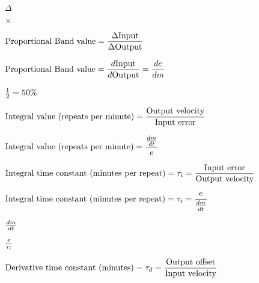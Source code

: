 \documentclass[12pt,a4paper,margin=2cm]{book}
\def\lthtmlcheckvsize{\ifdim\ht\sizebox<\vsize 
  \ifdim\wd\sizebox<\hsize\expandafter\hfill\fi \expandafter\vfill
  \else\expandafter\vss\fi}%
\begin{document}
{\newpage\clearpage
{}%
$ \Delta$%
\lthtmlindisplaymathZ
\lthtmlcheckvsize\clearpage}

{\newpage\clearpage
{}%
$ \times$%
\lthtmlindisplaymathZ
\lthtmlcheckvsize\clearpage}

{\newpage\clearpage
{}%
$\displaystyle \hbox{Proportional Band value} = {\Delta \hbox{Input} \over \Delta \hbox{Output}}$%
\lthtmlindisplaymathZ
\lthtmlcheckvsize\clearpage}

{\newpage\clearpage
{}%
$\displaystyle \hbox{Proportional Band value} = {d\hbox{Input} \over d\hbox{Output}} = {de \over dm}$%
\lthtmlindisplaymathZ
\lthtmlcheckvsize\clearpage}

{\newpage\clearpage
{}%
$ {1 \over 2} = 50\%$%
\lthtmlindisplaymathZ
\lthtmlcheckvsize\clearpage}

{\newpage\clearpage
{}%
$\displaystyle \hbox{Integral value (repeats per minute)} = {\hbox{Output velocity} \over \hbox{Input error}}$%
\lthtmlindisplaymathZ
\lthtmlcheckvsize\clearpage}

{\newpage\clearpage
{}%
$\displaystyle \hbox{Integral value (repeats per minute)} = {{dm \over dt} \over e}$%
\lthtmlindisplaymathZ
\lthtmlcheckvsize\clearpage}

{\newpage\clearpage
{}%
$\displaystyle \hbox{Integral time constant (minutes per repeat)} = \tau_i = {\hbox{Input error} \over \hbox{Output velocity}}$%
\lthtmlindisplaymathZ
\lthtmlcheckvsize\clearpage}

{\newpage\clearpage
{}%
$\displaystyle \hbox{Integral time constant (minutes per repeat)} = \tau_i = {e \over {dm \over dt}}$%
\lthtmlindisplaymathZ
\lthtmlcheckvsize\clearpage}

{\newpage\clearpage
{}%
$ dm \over dt$%
\lthtmlindisplaymathZ
\lthtmlcheckvsize\clearpage}

{\newpage\clearpage
{}%
$ e \over \tau_i$%
\lthtmlindisplaymathZ
\lthtmlcheckvsize\clearpage}

{\newpage\clearpage
{}%
$\displaystyle \hbox{Derivative time constant (minutes)} = \tau_d = {\hbox{Output offset} \over \hbox{Input velocity}}$%
\lthtmlindisplaymathZ
\lthtmlcheckvsize\clearpage}
\end{document}
